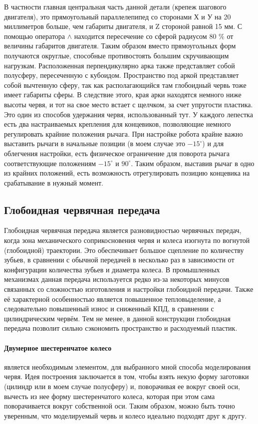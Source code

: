 В частности главная центральная часть данной детали (крепеж шагового двигателя), это прямоугольный параллелепипед со сторонами Х и У на 20 миллиметров больше, чем габариты двигателя, и  Z стороной равной 15 мм. С помощью оператора $\wedge$ находится пересечение со сферой радиусом 80 $\%$ от величины габаритов двигателя. Таким образом вместо прямоугольных форм получаются округлые,  способные противостоять большим скручивающим нагрузкам. Расположенная перпендикулярно арка также представляет собой полусферу, пересеченную с кубоидом. Пространство под аркой представляет собой вычтенную сферу, так как располагающийся там глобоидный червь тоже имеет габариты сферы. В следствие этого, края арки находятся немного ниже высоты червя, и тот на свое место встает с щелчком, за счет упругости пластика. Это один из способов удержания червя, использованный тут.
У каждого лепестка есть два настраиваемых крепления для концевиков, позволяющие немного регулировать крайние положения рычага. При настройке робота крайне важно выставить рычаги в начальные позиции (в моем случае это $-15^{\circ}$) и для облегчения настройки, есть физическое ограничение для поворота рычага соответствующие положениям $-15^{\circ}$ и $90^{\circ}$. Таким образом, выставив рычаг в одно из крайних положений, есть возможность отрегулировать позицию концевика на срабатывание в нужный момент. 

\subsection{Глобоидная червячная передача}

Глобоидная червячная передача является разновидностью червячных передач, когда зона механического соприкосновения червя и колеса изогнута по вогнутой (глобоидной) траектории. Это обеспечивает большое сцепление по количеству зубьев, в сравнении с обычной передачей в несколько раз в зависимости от конфигурации количества зубьев и диаметра колеса. В промышленных механизмах данная передача используется редко из-за некоторых минусов связанных со сложностью изготовления и настройки глобоидной передачи. Также её характерной особенностью является повышенное тепловыделение, а следовательно повышенный износ и сниженный КПД, в сравнении с цилиндрическим червём. Тем не менее, в данной конструкции глобоидная передача позволит сильно сэкономить пространство и расходуемый пластик.

\paragraph{Двумерное шестеренчатое колесо} является необходимым элементом, для выбранного мной способа моделирования червя. Идея построения заключается в том, чтобы взять некую форму заготовки (цилиндр или в моем случае полусферу) и, поворачивая ее вокруг своей оси, вычесть из нее форму шестеренчатого колеса, которая при этом сама поворачивается вокруг собственной оси. Таким образом, можно быть точно уверенным, что моделируемый червь и колесо идеально подходят друг к другу.

